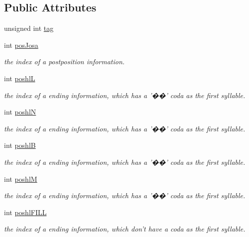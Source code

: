\subsection*{Public Attributes}
\begin{CompactItemize}
\item 
unsigned int \hyperlink{classJosaEomiTrieInfo_8294fbdd59f02d0448137cfc6b4a9f4d}{tag}
\item 
int \hyperlink{classJosaEomiTrieInfo_cf93b6828d86eef11b44e31dcdb64c8a}{posJosa}
\begin{CompactList}\small\item\em the index of a postposition information. \item\end{CompactList}\item 
int \hyperlink{classJosaEomiTrieInfo_fd2d03bf4a3296e04d6d481b0ddf2f73}{poshlL}
\begin{CompactList}\small\item\em the index of a ending information, which has a '��' coda as the first syllable. \item\end{CompactList}\item 
int \hyperlink{classJosaEomiTrieInfo_4914dd1866b5fc75ebe8a0cc152edfc3}{poshlN}
\begin{CompactList}\small\item\em the index of a ending information, which has a '��' coda as the first syllable. \item\end{CompactList}\item 
int \hyperlink{classJosaEomiTrieInfo_77a46726b05d28b368ee96f70103a81b}{poshlB}
\begin{CompactList}\small\item\em the index of a ending information, which has a '��' coda as the first syllable. \item\end{CompactList}\item 
int \hyperlink{classJosaEomiTrieInfo_b4804002b12abfb9705b0f249ad98637}{poshlM}
\begin{CompactList}\small\item\em the index of a ending information, which has a '��' coda as the first syllable. \item\end{CompactList}\item 
int \hyperlink{classJosaEomiTrieInfo_a43c431b8ca6cad51b0e7e0f4663749e}{poshlFILL}
\begin{CompactList}\small\item\em the index of a ending information, which don't have a coda as the first syllable. \item\end{CompactList}\end{CompactItemize}


